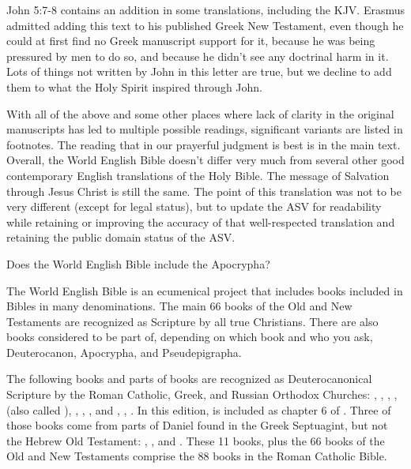 {\par }{ John 5:7-8 contains an addition in some translations, including the KJV. Erasmus admitted adding this text to his published Greek New Testament, even though he could at first find no Greek manuscript support for it, because he was being pressured by men to do so, and because he didn’t see any doctrinal harm in it. Lots of things not written by John in this letter are true, but we decline to add them to what the Holy Spirit inspired through John.
\par }{\IP With all of the above and some other places where lack of clarity in the original manuscripts has led to multiple possible readings, significant variants are listed in footnotes. The reading that in our prayerful judgment is best is in the main text. Overall, the World English Bible doesn’t differ very much from several other good contemporary English translations of the Holy Bible. The message of Salvation through Jesus Christ is still the same. The point of this translation was not to be very different (except for legal status), but to update the ASV for readability while retaining or improving the accuracy of that well-respected translation and retaining the public domain status of the ASV.
\par }{\IS Does the World English Bible include the Apocrypha?
\par }{\IP The World English Bible is an ecumenical project that includes books included in Bibles in many denominations. The main 66 books of the Old and New Testaments are recognized as Scripture by all true Christians. There are also books considered to be part of, depending on which book and who you ask, Deuterocanon, Apocrypha, and Pseudepigrapha.
\par }{\IP The following books and parts of books are recognized as Deuterocanonical Scripture by the Roman Catholic, Greek, and Russian Orthodox Churches:
{},
{},
{},
{},
{} (also called
{}),
{},
{},
{}, and
{},
{},
{}. In this edition,
{} is included as chapter 6 of
{}. Three of those books come from parts of Daniel found in the Greek Septuagint, but not the Hebrew Old Testament:
{},
{}, and
{}. These 11 books, plus the 66 books of the Old and New Testaments comprise the 88 books in the Roman Catholic Bible.
}
